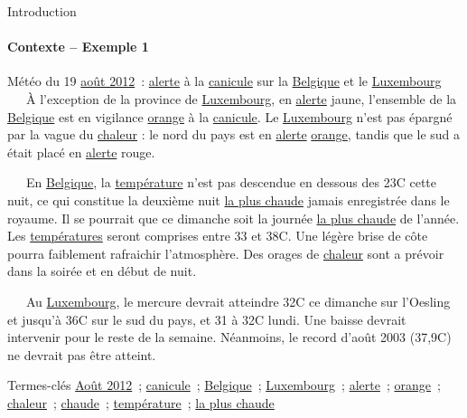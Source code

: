 \begin{frame}{Introduction}\framesubtitle{Contexte -- Exemple 1}
  \begin{exampleblock}{\small
    Météo du 19 \underline{août 2012}~: \underline{alerte} à la
    \underline{canicule} sur la \underline{Belgique} et le
    \underline{Luxembourg}
  }\justifying\small
    ~~~À l'exception de la province de \underline{Luxembourg}, en
    \underline{alerte} jaune, l'ensemble de la \underline{Belgique} est en
    vigilance \underline{orange} à la \underline{canicule}. Le
    \underline{Luxembourg} n'est pas épargné par la vague du \underline{chaleur}
    : le nord du pays est en \underline{alerte} \underline{orange}, tandis que
    le sud a était placé en \underline{alerte} rouge.

    ~~~En \underline{Belgique}, la \underline{température} n'est pas descendue
    en dessous des 23\degre{}C cette nuit, ce qui constitue la deuxième nuit
    \underline{la plus chaude} jamais enregistrée dans le royaume. Il se
    pourrait que ce dimanche soit la journée \underline{la plus chaude} de
    l'année. Les \underline{températures} seront comprises entre 33 et
    38\degre{}C. Une légère brise de côte pourra faiblement rafraichir
    l'atmosphère. Des orages de \underline{chaleur} sont a prévoir dans la
    soirée et en début de nuit.

    ~~~Au \underline{Luxembourg}, le mercure devrait atteindre 32\degre{}C ce
    dimanche sur l'Oesling et jusqu'à 36\degre{}C sur le sud du pays, et 31 à
    32\degre{}C lundi. Une baisse devrait intervenir pour le reste de la
    semaine. Néanmoins, le record d'août 2003 (37,9\degre{}C) ne devrait pas
    être atteint.

    \begin{exampleblock}{\small Termes-clés}\justifying\small
      \underline{Août 2012}~; \underline{canicule}~;
      \underline{Belgique}~; \underline{Luxembourg}~; \underline{alerte}~;
      \underline{orange}~; \underline{chaleur}~; \underline{chaude}~;
      \underline{température}~; \underline{la plus chaude}
    \end{exampleblock}
  \end{exampleblock}
\end{frame}

